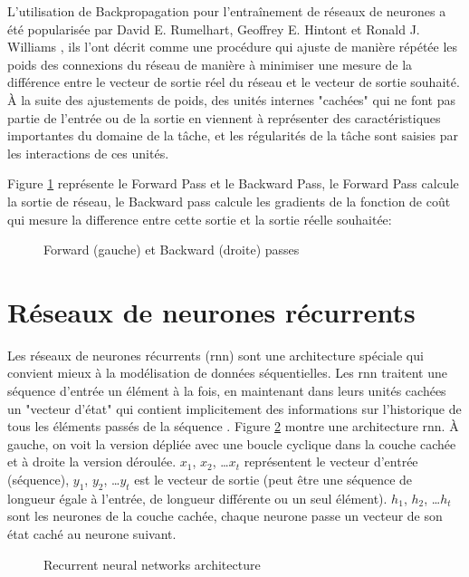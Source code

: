 L'utilisation de Backpropagation pour l'entraînement de réseaux de neurones a été popularisée par David E. Rumelhart, Geoffrey E. Hintont et Ronald J. Williams \cite{Rumelhart1986}, ils l'ont décrit comme une procédure qui ajuste de manière répétée les poids des connexions du réseau de manière à minimiser une mesure de la différence entre le vecteur de sortie réel du réseau et le vecteur de sortie souhaité. À la suite des ajustements de poids, des unités internes "cachées" qui ne font pas partie de l'entrée ou de la sortie en viennent à représenter des caractéristiques importantes du domaine de la tâche, et les régularités de la tâche sont saisies par les interactions de ces unités.

Figure \ref{fig:forward-backward-pass} représente le Forward Pass et le Backward Pass, le Forward Pass calcule la sortie de réseau, le Backward pass calcule les gradients de la fonction de coût qui mesure la difference entre cette sortie et la sortie réelle souhaitée:

\begin{figure}[h]
    \centering
	
    \caption{Forward (gauche) et Backward (droite) passes}
    \label{fig:forward-backward-pass}
\end{figure}


\section{Réseaux de neurones récurrents}
Les réseaux de neurones récurrents (\acrshort{rnn}) sont une architecture spéciale qui convient mieux à la modélisation de données séquentielles. Les \acrshort{rnn} traitent une séquence d'entrée un élément à la fois, en maintenant dans leurs unités cachées un "vecteur d'état" qui contient implicitement des informations sur l'historique de tous les éléments passés de la séquence \cite{LeCun2015}. Figure \ref{fig:rnn} montre une architecture \acrshort{rnn}. À gauche, on voit la version dépliée avec une boucle cyclique dans la couche cachée et à droite la version déroulée. $x_1$, $x_2$, …$x_t$ représentent le vecteur d'entrée (séquence), $y_1$, $y_2$, …$y_t$ est le vecteur de sortie (peut être une séquence de longueur égale à l'entrée, de longueur différente ou un seul élément). $h_1$, $h_2$, …$h_t$ sont les neurones de la couche cachée, chaque neurone passe un vecteur de son état caché au neurone suivant.

\begin{figure}[H]
    \centering
    
    \caption{Recurrent neural networks architecture}
    \label{fig:rnn}
\end{figure}


